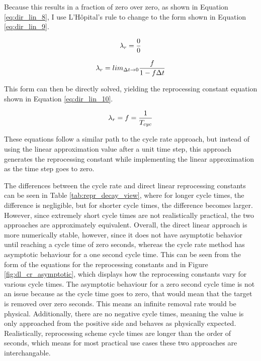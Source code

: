 Because this results in a fraction of zero over zero, as shown in Equation \eqref{eq:dir_lin_8}, I use L'Hôpital's rule to change to the form shown in Equation \eqref{eq:dir_lin_9}.

\begin{equation} \hfill
\lambda_r = \frac{0}{0}
\hfill\label{eq:dir_lin_8} \end{equation}

\begin{equation} \hfill
\lambda_r = lim_{\Delta t \to 0} \frac{f}{1-f\Delta t}
\hfill\label{eq:dir_lin_9} \end{equation}

This form can then be directly solved, yielding the reprocessing constant equation shown in Equation \eqref{eq:dir_lin_10}.

\begin{equation} \hfill
\lambda_r = f = \frac{1}{T_{cyc}}
\hfill\label{eq:dir_lin_10} \end{equation}

These equations follow a similar path to the cycle rate approach, but instead of using the linear approximation value after a unit time step, this approach generates the reprocessing constant while implementing the linear approximation as the time step goes to zero.

The differences between the cycle rate and direct linear reprocessing constants can be seen in Table \ref{tab:repr_decay_view}, where for longer cycle times, the difference is negligible, but for shorter cycle times, the difference becomes larger. However, since extremely short cycle times are not realistically practical, the two approaches are approximately equivalent. Overall, the direct linear approach is more numerically stable, however, since it does not have asymptotic behavior until reaching a cycle time of zero seconds, whereas the cycle rate method has asymptotic behaviour for a one second cycle time. This can be seen from the form of the equations for the reprocessing constants and in Figure \ref{fig:dl_cr_asymptotic}, which displays how the reprocessing constants vary for various cycle times. The asymptotic behaviour for a zero second cycle time is not an issue because as the cycle time goes to zero, that would mean that the target is removed over zero seconds. This means an infinite removal rate would be physical. Additionally, there are no negative cycle times, meaning the value is only approached from the positive side and behaves as physically expected. Realistically, reprocessing scheme cycle times are longer than the order of seconds, which means for most practical use cases these two approaches are interchangable.

